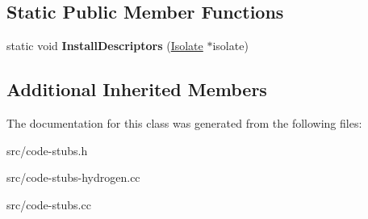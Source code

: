 \subsection*{Static Public Member Functions}
\begin{DoxyCompactItemize}
\item 
\hypertarget{classv8_1_1internal_1_1_fast_clone_shallow_array_stub_ac132aee792163441b7f7fd97c29a48ce}{}static void {\bfseries Install\+Descriptors} (\hyperlink{classv8_1_1internal_1_1_isolate}{Isolate} $\ast$isolate)\label{classv8_1_1internal_1_1_fast_clone_shallow_array_stub_ac132aee792163441b7f7fd97c29a48ce}

\end{DoxyCompactItemize}
\subsection*{Additional Inherited Members}


The documentation for this class was generated from the following files\+:\begin{DoxyCompactItemize}
\item 
src/code-\/stubs.\+h\item 
src/code-\/stubs-\/hydrogen.\+cc\item 
src/code-\/stubs.\+cc\end{DoxyCompactItemize}
